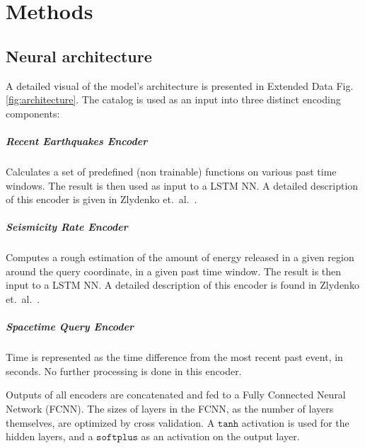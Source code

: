 \documentclass[pdflatex]{sn-jnl}
\begin{document}
\newpage
\unnumbered

\unnumbered
\section{Methods}
\subsection{Neural architecture}
A detailed visual of the model's architecture is presented in Extended Data Fig. \ref{fig:architecture}. The catalog is used as an input into three distinct encoding components:
\subparagraph{\textbf{Recent Earthquakes Encoder}} Calculates a set of predefined (non trainable) functions on various past time windows. The result is then used as input to a LSTM NN. A detailed description of this encoder is given in Zlydenko et.~al.~\cite{zlydenko_neural_2023}. 

\subparagraph{\textbf{Seismicity Rate Encoder}} Computes a rough estimation of the amount of energy released in a given region around the query coordinate, in a given past time window. The result is then input to a LSTM NN. A detailed description of this encoder is found in Zlydenko et.~al.~\cite{zlydenko_neural_2023}.

\subparagraph{\textbf{Spacetime Query Encoder}} Time is represented as the time difference from the most recent past event, in seconds. No further processing is done in this encoder.

Outputs of all encoders are concatenated and fed to a Fully Connected Neural Network (FCNN). The sizes of layers in the FCNN, as the number of layers themselves, are optimized by cross validation. A $\texttt{tanh}$ activation is used for the hidden layers, and a $\texttt{softplus}$ as an activation on the output layer. 
\end{document}
